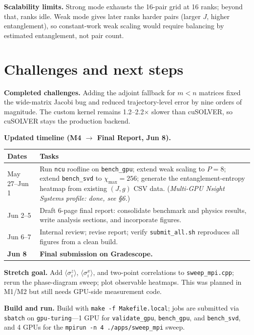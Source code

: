 \documentclass[11pt]{article}
\newcommand{\code}[1]{\texttt{#1}}
\begin{document}
\textbf{Scalability limits.}  Strong mode exhausts the 16-pair grid at
16 ranks; beyond that, ranks idle.  Weak mode gives later ranks harder
pairs (larger $J$, higher entanglement), so constant-work weak scaling would
require balancing by estimated entanglement, not pair count.

\section{Challenges and next steps}

\textbf{Completed challenges.}
Adding the adjoint fallback for $m<n$ matrices fixed the wide-matrix Jacobi
bug and reduced trajectory-level error by nine orders of magnitude.  The
custom kernel remains 1.2--2.2$\times$ slower than cuSOLVER, so cuSOLVER
stays the production backend.

\textbf{Updated timeline (M4 $\to$ Final Report, Jun 8).}

\begin{table}[h]
\centering\small
\begin{tabular}{p{2.8cm}p{10.4cm}}
\toprule
\textbf{Dates} & \textbf{Tasks} \\
\midrule
May 27--Jun 1 &
  Run \code{ncu} roofline on \code{bench\_gpu}; extend weak scaling to
  $P{=}8$; extend \code{bench\_svd} to $\chi_{\max}{=}256$; generate the
  entanglement-entropy heatmap from existing $(J,g)$ CSV data.
  (\emph{Multi-GPU Nsight Systems profile: done, see \S6.}) \\
\addlinespace
Jun 2--5 &
  Draft 6-page final report: consolidate benchmark and physics results,
  write analysis sections, and incorporate figures. \\
\addlinespace
Jun 6--7 &
  Internal review; revise report; verify \code{submit\_all.sh}
  reproduces all figures from a clean build. \\
\addlinespace
\textbf{Jun 8} &
  \textbf{Final submission on Gradescope.} \\
\bottomrule
\end{tabular}
\end{table}

\textbf{Stretch goal.}
Add $\langle\sigma^z_i\rangle$, $\langle\sigma^x_i\rangle$, and two-point
correlations to \code{sweep\_mpi.cpp}; rerun the phase-diagram sweep; plot
observable heatmaps.  This was planned in M1/M2 but still needs GPU-side
measurement code.

\textbf{Build and run.}  Build with \code{make -f Makefile.local}; jobs are
submitted via \code{sbatch} on \code{gpu-turing}---1 GPU for \code{validate\_gpu},
\code{bench\_gpu}, and \code{bench\_svd}, and 4 GPUs for the
\code{mpirun -n 4 ./apps/sweep\_mpi} sweep.
\end{document}
